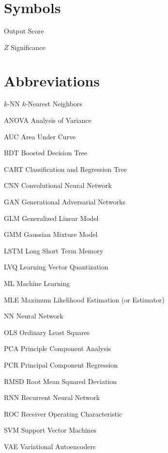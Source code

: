 \abbreviations

\section*{Symbols}

\begin{symbollist}
	\item[\yhat] Output Score
	\item[$Z$] Significance
\end{symbollist}

\section*{Abbreviations}

\begin{symbollist}
	\item[$k$-NN] $k$-Nearest Neighbors
	\item[ANOVA] Analysis of Variance
	\item[AUC] Area Under Curve
	\item[BDT] Boosted Decision Tree
	\item[CART] Classification and Regression Tree
	\item[CNN] Convolutional Neural Network
	\item[GAN] Generational Adversarial Networks
	\item[GLM] Generalized Linear Model
	\item[GMM] Gaussian Mixture Model
	\item[LSTM] Long Short Term Memory
	\item[LVQ] Learning Vector Quantization
	\item[ML] Machine Learning
	\item[MLE] Maximum Likelihood Estimation (or Estimator)
	\item[NN] Neural Network
	\item[OLS] Ordinary Least Squares
	\item[PCA] Principle Component Analysis
	\item[PCR] Principal Component Regression
	\item[RMSD] Root Mean Squared Deviation
	\item[RNN] Recurrent Neural Network
	\item[ROC] Receiver Operating Characteristic
	\item[SVM] Support Vector Machines
	\item[VAE] Variational Autoencoders
\end{symbollist}
